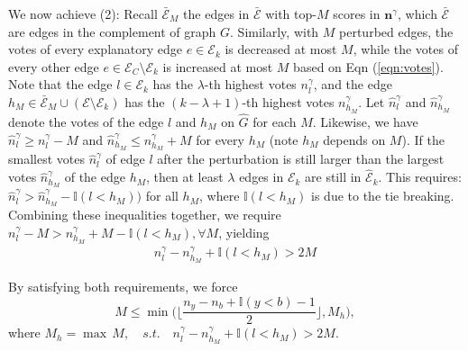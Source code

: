 We now achieve (2): Recall $\bar{\mathcal{E}}_M $ the edges  in $\bar{\mathcal{E}}$ with top-$M$ scores in $\textbf{n}^{\gamma}$, which $\bar{\mathcal{E}}$ are edges in the complement of graph $G$. 
Similarly, with $M$ perturbed edges, the votes of every explanatory edge $e \in \mathcal{E}_k$ is decreased at most $M$, while the votes of every other edge $e \in \mathcal{E}_C \setminus \mathcal{E}_k$ is increased at most $M$ based on Eqn (\ref{eqn:votes}). 
Note that the edge $l \in \mathcal{E}_k$ has the $\lambda$-th highest votes $n_{l}^{\gamma}$, and the edge $h_M \in \bar{\mathcal{E}}_M \cup (\mathcal{E} \setminus \mathcal{E}_k)$ has the $(k-\lambda+1)$-th highest votes $n_{h_M}^{\gamma}$. 
Let $\hat{n}_{l}^{\gamma}$ and $\hat{n}_{h_M}^{\gamma}$ denote the votes of the edge $l$ and $h_M$ on $\hat{G}$ for each $M$. 
Likewise, we have $\hat{n}_{l}^{\gamma} \geq n_{l}^{\gamma} - M$ and $\hat{n}_{h_M}^{\gamma}  \leq {n}_{h_M}^{\gamma} + M$ for every $h_M$ (note $h_M$ depends on $M$). 
If the smallest votes $\hat{n}_{l}^{\gamma}$ of edge $l$ after the perturbation is still larger than the largest votes $\hat{n}_{h_M}^{\gamma}$ of the edge $h_M$, then at least $\lambda$ edges in $\mathcal{E}_k$ are still in $\hat{\mathcal{E}}_k$. 
This requires: $\hat{n}_{l}^{\gamma} > \hat{n}_{h_M}^{\gamma} - \mathbb{I}(l<h_M))$ for all $h_M$, where $\mathbb{I}(l<h_M)$ is due to the tie breaking. 
Combining these inequalities together, we require ${n}_{l}^\gamma -M > {n}_{h_M}^\gamma +M - \mathbb{I}(l<h_M), \forall M$, yielding
\begin{align}
\label{eqn:reqxGNN}
{n}_{l}^\gamma- {n}_{h_M}^\gamma + \mathbb{I}(l<h_M) > 2M
\end{align}

By satisfying both requirements, we force 
$$M \leq \min \big( \lfloor \frac{n_y-n_{b} + \mathbb{I}(y<b)-1}{2} \rfloor, M_h\big),$$
where $M_h = \max \, M,  \quad {s.t.} \quad {n}_{l}^\gamma- {n}_{h_M}^\gamma + \mathbb{I}(l<h_M) > 2M.$

